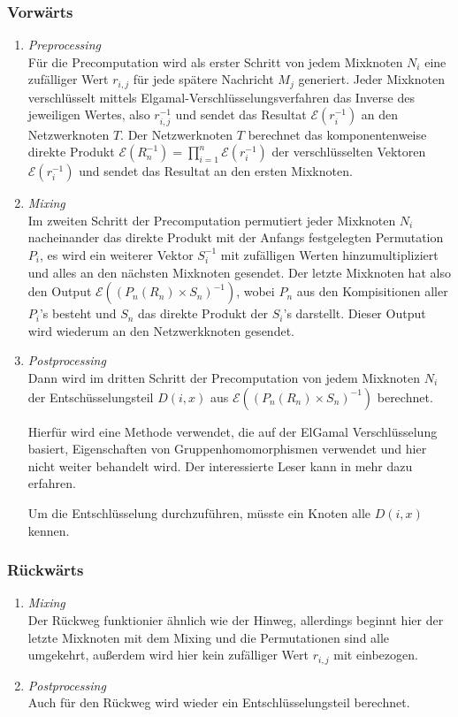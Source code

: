 \documentclass[
    fontsize=12pt,
    headings=small,
    parskip=half,           %
    bibliography=totoc,
    numbers=noenddot,       %
    open=any,               %
    ]{scrreprt}
\begin{document}
\subsubsection{Vorwärts}
\begin{enumerate}
	\item  \textit{Preprocessing} \\
	Für die Precomputation wird als erster Schritt von jedem Mixknoten $N_i$ eine zufälliger Wert $r_{i,j}$ für jede spätere Nachricht $M_j$ generiert.
Jeder Mixknoten verschlüsselt mittels Elgamal-Verschlüsselungsverfahren
das Inverse des jeweiligen Wertes, also \(r_{i,j}^{-1}\) und sendet das Resultat \(\mathcal{E} (r_i^{-1})\) an den Netzwerknoten $T$.
Der Netzwerknoten $T$ berechnet das komponentenweise direkte Produkt \(\mathcal{E}( R_n^{-1})=\prod_{i=1}^n \mathcal{E} (r_i^{-1})\) der verschlüsselten Vektoren \(\mathcal{E} (r_i^{-1})\) und sendet das Resultat an den ersten Mixknoten.
	
	\item \textit{Mixing} \\
	Im zweiten Schritt der Precomputation permutiert jeder Mixknoten $N_i$ nacheinander das direkte Produkt mit der Anfangs festgelegten Permutation $P_i$, es wird ein weiterer Vektor \(S_i^{-1} \) mit zufälligen Werten hinzumultipliziert und alles an den nächsten Mixknoten gesendet.
Der letzte Mixknoten hat also den Output \(\mathcal{E} ((P_n(R_n) \times S_n )^{-1})\),
wobei $P_n$ aus den Kompisitionen aller $P_i$'s besteht und $S_n$ das direkte Produkt der $S_i$'s darstellt.
Dieser Output wird wiederum an den Netzwerkknoten gesendet.

	\item \textit{Postprocessing} \\
	Dann wird im dritten Schritt der Precomputation von jedem Mixknoten $N_i$ 
der Entschüsselungsteil $D(i,x)$ aus \(\mathcal{E} ((P_n(R_n) \times S_n )^{-1})\) berechnet.

Hierfür wird eine Methode verwendet, die auf der ElGamal Verschlüsselung basiert,
Eigenschaften von Gruppenhomomorphismen verwendet und hier nicht weiter behandelt wird.
Der interessierte Leser kann in \cite{benaloh2006simple} mehr dazu erfahren.

Um die Entschlüsselung durchzuführen, müsste ein Knoten alle $D(i,x)$ kennen.
\end{enumerate}

\subsubsection{Rückwärts}
\begin{enumerate}
	\item \textit{Mixing} \\
	Der Rückweg funktionier ähnlich wie der Hinweg, allerdings beginnt hier der letzte Mixknoten mit dem Mixing und die Permutationen sind alle umgekehrt, außerdem wird hier kein zufälliger Wert
	$r_{i,j}$ mit einbezogen.
	
	\item \textit{Postprocessing} \\
	Auch für den Rückweg wird wieder ein Entschlüsselungsteil berechnet.
	
\end{enumerate}
\end{document}
